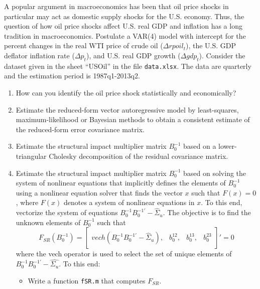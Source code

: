 A popular argument in macroeconomics has been that oil price shocks in particular may act as domestic supply shocks for the U.S. economy. Thus, the question of how oil price shocks affect U.S. real GDP and inflation has a long tradition in macroeconomics. Postulate a VAR(4) model with intercept for the percent changes in the real WTI price of crude oil ($\Delta rpoil_t$), the U.S. GDP deflator inflation rate ($\Delta p_t$), and U.S. real GDP growth ($\Delta gdp_t$). Consider the dataset given in the sheet \enquote{USOil} in the file \texttt{data.xlsx}. The data are quarterly and the estimation period is 1987q1-2013q2.

\begin{enumerate}
    \item How can you identify the oil price shock statistically and economically?


    \item Estimate the reduced-form vector autoregressive model by least-squares, maximum-likelihood or Bayesian methods to obtain a consistent estimate of the reduced-form error covariance matrix.

    \item Estimate the structural impact multiplier matrix $B_0^{-1}$ based on a lower-triangular Cholesky decomposition of the residual covariance matrix.

    \item Estimate the structural impact multiplier matrix $B_0^{-1}$ based on solving the system of nonlinear equations that implicitly defines the elements of $B_0^{-1}$ using a nonlinear equation solver that finds the vector $x$ such that $F(x)=0$, where $F(x)$ denotes a system of nonlinear equations in $x$. To this end, vectorize the system of equations $B_0^{-1} B_{0}^{-1'} - \hat{\Sigma}_u$. The objective is to find the unknown elements of $B_0^{-1}$ such that
          $$ F_{SR}(B_0^{-1}) = \begin{bmatrix} vech\left(B_0^{-1} B_0^{-1'} - \hat{\Sigma}_u\right),&b_0^{12},&b_0^{13},&b_0^{23}\end{bmatrix}'=0$$
          where the vech operator is used to select the set of unique elements of $B_0^{-1}B_0^{-1'} - \hat{\Sigma_u}$. To this end:
          \begin{itemize}
              \item Write a function \texttt{fSR.m} that computes $F_{SR}$.


\end{itemize}
\end{enumerate}
